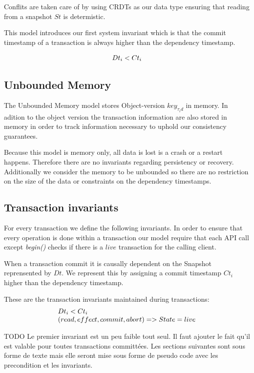 \documentclass[parallelisme]{compas2022}
\begin{document}
Conflits are taken care of by using CRDTs as our data type ensuring that reading from a snapshot $St$ is determistic.

This model introduces our first system invariant which is that the commit timestamp of a transaction is always higher than the dependency timestamp.

\[
  \begin{array}{lcl}
    \emph{$Dt_i < Ct_i$}
  \end{array} 
\]

\subsection{Unbounded Memory}

The Unbounded Memory model stores Object-version $key_{\tau_id}$ in memory.
In adition to the object version the transaction information are also stored in memory in order to track information necessary to uphold our consistency guarantees.

Because this model is memory only, all data is lost is a crash or a restart happens.
Therefore there are no invariants regarding persistency or recovery.
Additionally we consider the memory to be unbounded so there are no restriction on the size of the data or constraints on the dependency timestamps.

\subsection{Transaction invariants}

For every transaction we define the following invariants.
In order to ensure that every operation is done within a transaction our model require that each API call except \emph{begin()} checks if there is a $live$ transaction for the calling client.

When a transaction commit it is causally dependent on the Snapshot reprensented by $Dt$.
We represent this by assigning a commit timestamp $Ct_i$ higher than the dependency timestamp.

These are the transaction invariants maintained during transactions:
\[
  \begin{array}{lcl}
    \emph{$Dt_i < Ct_i$}\\
    \emph{$(read, effect, commit, abort) => State = live$}
  \end{array} 
\]


TODO Le premier invariant est un peu faible tout seul. Il faut ajouter le fait qu'il est valable pour toutes transactions committées. Les sections suivantes sont sous forme de texte mais elle seront mise sous forme de pseudo code avec les precondition et les invariants.\\
\end{document}
